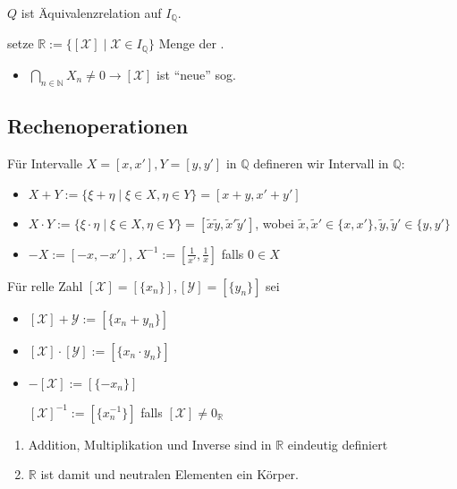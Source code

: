 \begin{proposition}
	$Q$ ist Äquivalenzrelation auf $I_\mathbb{Q}$.
\end{proposition}

\begin{*definition}
	setze $\mathbb{R} := \{ [\mathcal{X}] \mid \mathcal{X}\in I_\mathbb{Q} \}$ Menge der .
	
	\begin{itemize}
		\item $\bigcap_{n\in\mathbb{N}} X_n \neq 0 \rightarrow [\mathcal{X}]$ ist "`neue"' sog. 
	\end{itemize}
\end{*definition}

\subsection{Rechenoperationen}
\begin{*definition}
	Für Intervalle $X=[x,x'], Y=[y,y']$ in $\mathbb{Q}$ defineren wir Intervall in $\mathbb{Q}$:
	\begin{itemize}
		\item $X + Y := \{\xi + \eta \mid \xi \in X, \eta\in Y\} = [x + y, x' + y']$
		\item $X\cdot Y :=\{\xi \cdot \eta \mid \xi \in X, \eta\in Y\} = [\tilde{x}\tilde{y}, \tilde{x}'\tilde{y}']$, wobei $\tilde{x},\tilde{x}'\in\{x,x'\},\tilde{y},\tilde{y}'\in\{y,y'\}$
		\item $-X := [-x,-x']$, $X^{-1}:=[\frac{1}{x'}, \frac{1}{x}]$ falls $0\in X$
	\end{itemize}

	Für relle Zahl $[\mathcal{X}] = [\{x_n\}], [\mathcal{Y}]=[\{y_n\}]$ sei
	\begin{itemize}
		\item $[\mathcal{X}]+\mathcal{Y} :=[\{x_n + y_n\}]$
		\item $[\mathcal{X}]\cdot[\mathcal{Y}] :=[\{x_n\cdot y_n\}]$
		\item $-[\mathcal{X}]:=[\{-x_n\}]$
			
			$[\mathcal{X}]^{-1} := [\{x_n^{-1}\}]$ falls $[\mathcal{X}]\neq 0_\mathbb{R}$
	\end{itemize}
\end{*definition}

\begin{proposition}
	\begin{enumerate}[label={\arabic*)}]
		\item Addition, Multiplikation und Inverse sind in $\mathbb{R}$ eindeutig definiert
		\item $\mathbb{R}$ ist damit und neutralen Elementen ein Körper.
	\end{enumerate}
\end{proposition}


